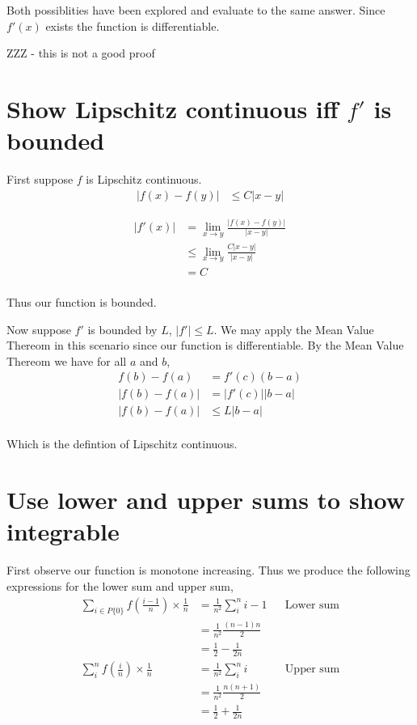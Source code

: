 \documentclass{article}
\begin{document}
Both possiblities have been explored and evaluate to the same answer. Since
$f'(x)$ exists the function is differentiable.

ZZZ - this is not a good proof

\section{Show Lipschitz continuous iff $f'$ is bounded}
First suppose $f$ is Lipschitz continuous.
\begin{align*}
    |f(x) - f(y)| &\leq C|x - y|
\end{align*}

\begin{align*}
    |f'(x)| &= \lim_{x \to y} \frac{|f(x) - f(y)|}{|x - y|} \\
    &\leq \lim_{x \to y} \frac{C|x - y|}{|x - y|} \\
    &= C \\
\end{align*}

Thus our function is bounded.

Now suppose $f'$ is bounded by $L$, $|f'| \leq L$.
We may apply the Mean Value Thereom in this scenario since our function is
differentiable. By the Mean Value Thereom we have for all $a$ and $b$,
\begin{align*}
    f(b) - f(a) &= f'(c)(b - a) \\
    |f(b) - f(a)| &= |f'(c)||b - a| \\
    |f(b) - f(a)| &\leq L|b - a| \\
\end{align*}

Which is the defintion of Lipschitz continuous.

\section{Use lower and upper sums to show integrable}
First observe our function is monotone increasing.
Thus we produce the following expressions for the lower sum and upper sum,
\begin{align*}
    \sum_{i \in P \{0\}} f\left(\frac{i - 1}{n}\right) \times \frac{1}{n}
    &= \frac{1}{n^2} \sum_i^n i-1 && \text{Lower sum} \\
    &= \frac{1}{n^2} \frac{(n-1)n}{2} \\
    &= \frac{1}{2} - \frac{1}{2n} \\
    \sum_i^n f\left(\frac{i}{n}\right) \times \frac{1}{n}
    &= \frac{1}{n^2} \sum_i^n i && \text{Upper sum} \\
    &= \frac{1}{n^2} \frac{n(n+1)}{2} \\
    &= \frac{1}{2} + \frac{1}{2n} \\
\end{align*}
\end{document}
